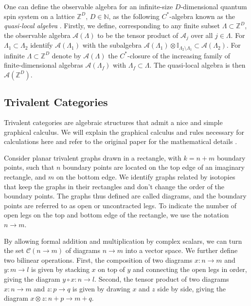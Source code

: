 \documentclass[11pt,oneside]{amsart}
\theoremstyle{plain}%
\theoremstyle{definition}
\theoremstyle{remark}
\begin{document}
One can define the observable algebra for an infinite-size $D$-dimensional quantum spin system on a lattice $\mathbb{Z}^D$, $D\in\mathbb{N}$, as the following $C^*$-algebra known as the \emph{quasi-local algebra} \cite{bratteliOperatorAlgebrasQuantum1997}. Firstly, we define, corresponding to any finite subset $\Lambda \subset \mathbb{Z}^D$, the observable algebra $\mathcal{A}(\Lambda)$ to be the tensor product of $\mathcal{A}_j$ over all $j\in \Lambda$. For $\Lambda_1\subset \Lambda_2$ identify $\mathcal{A}(\Lambda_1)$ with the subalgebra $\mathcal{A}(\Lambda_1)\otimes \mathbb{I}_{\Lambda_2\setminus \Lambda_1} \subset \mathcal{A}(\Lambda_2)$. For infinite $\Lambda \subset \mathbb{Z}^D$ denote by $\mathcal{A}(\Lambda)$ the $C^*$-closure of the increasing family of finite-dimensional algebras $\mathcal{A}(\Lambda_f)$ with $\Lambda_f \subset \Lambda$. The quasi-local algebra is then $\mathcal{A}(\mathbb{Z}^D)$.

\subsection{Trivalent Categories}

Trivalent categories are algebraic structures that admit a nice and simple graphical calculus. We will explain the graphical calculus and rules necessary for calculations here and refer to the original paper for the mathematical details \cite{morrison_categories_2015}.

Consider planar trivalent graphs drawn in a rectangle, with $k=n+m$ boundary points, such that $n$ boundary points are located on the top edge of an imaginary rectangle, and $m$ on the bottom edge. We identify graphs related by isotopies that keep the graphs in their rectangles and don't change the order of the boundary points. The graphs thus defined are called diagrams, and the boundary points are referred to as open or uncontracted legs. To indicate the number of open legs on the top and bottom edge of the rectangle, we use the notation $n\to m$.

By allowing formal addition and multiplication by complex scalars, we can turn the set $\mathcal{C}(n\to m)$ of diagrams $n\to m$ into a vector space. We further define two bilinear operations. First, the composition of two diagrams $x\colon n\to m$ and $y\colon m\to l$ is given by stacking $x$ on top of $y$ and connecting the open legs in order, giving the diagram $y\circ x\colon n\to l$. Second, the tensor product of two diagrams $x\colon n\to m$ and $z\colon p\to q$ is given by drawing $x$ and $z$ side by side, giving the diagram $x\otimes z\colon n+p\to m+q$.
\end{document}
